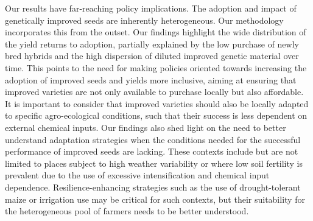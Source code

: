 \documentclass[11pt]{article}
\begin{document}
Our results have far-reaching policy implications. The adoption and impact of genetically improved seeds are inherently heterogeneous. Our methodology incorporates this from the outset. Our findings highlight the wide distribution of the yield returns to adoption, partially explained by the low purchase of newly bred hybrids and the high dispersion of diluted improved genetic material over time. This points to the need for making policies oriented towards increasing the adoption of improved seeds and yields more inclusive, aiming at ensuring that improved varieties are not only available to purchase locally but also affordable. It is important to consider that improved varieties should also be locally adapted to specific agro-ecological conditions, such that their success is less dependent on external chemical inputs. Our findings also shed light on the need to better understand adaptation strategies when the conditions needed for the successful performance of improved seeds are lacking. These contexts include but are not limited to places subject to high weather variability or where low soil fertility is prevalent due to the use of excessive intensification and chemical input dependence. Resilience-enhancing strategies such as the use of drought-tolerant maize or irrigation use may be critical for such contexts, but their suitability for the heterogeneous pool of farmers needs to be better understood. 


\end{document}
